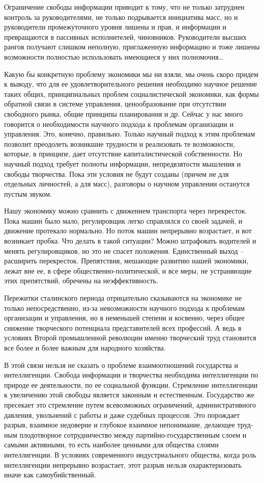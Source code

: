 \documentclass{book}
\begin{document}
Ограничение свободы информации приводит к тому, что не только затруднен контроль за руководителями, не только под­рывается 
инициатива масс, но и руководители промежуточного уровня лишены и прав, и информации и превращаются в пассив­ных исполнителей, 
чиновников. Руководители высших рангов получают слишком неполную, приглаженную информацию и тоже лишены возможности полностью 
использовать имеющие­ся у них полномочия\ldots

Какую бы конкретную проблему экономики мы ни взяли, мы очень скоро придем к выводу, что для ее удовлетворитель­ного решения 
необходимо научное решение таких общих, прин­ципиальных проблем социалистической экономики, как формы обратной связи в системе 
управления, ценообразование при отсутствии свободного рынка, общие принципы планирования и др. Сейчас у нас много говорится о 
необходимости научного подхода к проблемам организации и управления. Это, конеч­но, правильно. Только научный подход к этим 
проблемам позволит преодолеть возникшие трудности и реализовать те воз­можности, которые, в принципе, дает отсутствие 
капиталисти­ческой собственности. Но научный подход требует полноты ин­формации, непредвзятости мышления и свободы творчества. 
Пока эти условия не будут созданы (причем не для отдельных личностей, а для масс), разговоры о научном управлении оста­нутся 
пустым звуком.

Нашу экономику можно сравнить с движением транспорта через перекресток. Пока машин было мало, регулировщик лег­ко справлялся со 
своей задачей, и движение протекало нормаль­но. Но поток машин непрерывно возрастает, и вот возникает пробка. Что делать в такой 
ситуации? Можно штрафовать води­телей и менять регулировщиков, но это не спасет положения. Единственный выход -- расширить 
перекресток. Препятствия, мешающие развитию нашей экономики, лежат вне ее, в сфере общественно-политической, и все меры, не 
устраняющие этих препятствий, обречены на неэффективность.

Пережитки сталинского периода отрицательно сказываются на экономике не только непосредственно, из-за невозможности научного 
подхода к проблемам организации и управления, но в неменьшей степени и косвенно, через общее снижение твор­ческого потенциала 
представителей всех профессий. А ведь в условиях Второй промышленной революции именно творчес­кий труд становится все более и 
более важным для народного хозяйства.

В этой связи нельзя не сказать о проблеме взаимоотношений государства и интеллигенции. Свобода информации и творчест­ва 
необходима интеллигенции по природе ее деятельности, по ее социальной функции. Стремление интеллигенции к увели­чению этой 
свободы является законным и естественным. Госу­дарство же пресекает это стремление путем всевозможных ог­раничений, 
административного давления, увольнений с работы и даже судебных процессов. Это порождает разрыв, взаимное недоверие и глубокое 
взаимное непонимание, делающее труд­ным плодотворное сотрудничество между партийно-государст­венным слоем и самыми активными, то 
есть наиболее ценными для общества слоями интеллигенции. В условиях современного индустриального общества, когда роль 
интеллигенции непрерывно возрастает, этот разрыв нельзя охарактеризовать иначе как самоубийственный.
\end{document}
